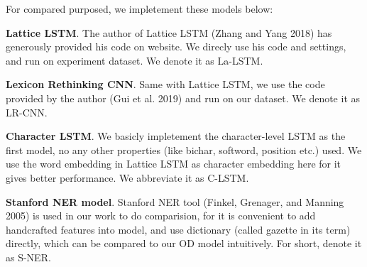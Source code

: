 \documentclass[letterpaper]{article} %
\begin{document}
\begin{table}[t]
\caption{Hyperparameters}\smallskip
\centering
{}
\label{table2}
\end{table}

For compared purposed, we impletement these models below:

\textbf{Lattice LSTM}. The author of Lattice LSTM (Zhang and Yang 2018) has generously provided his code on website. We direcly use his code and settings, and run on experiment dataset. We denote it as La-LSTM.

\textbf{Lexicon Rethinking CNN}. Same with Lattice LSTM, we use the code provided by the author (Gui et al. 2019) and run on our dataset. We denote it as LR-CNN.

\textbf{Character LSTM}. We basicly impletement the character-level LSTM as the first model, no any other properties (like bichar, softword, position etc.) used. We use the word embedding in Lattice LSTM as character embedding here for it gives better performance. We abbreviate it as C-LSTM.

\textbf{Stanford NER model}. Stanford NER tool (Finkel, Grenager, and Manning 2005) is used in our work to do comparision, for it is convenient to add handcrafted features into model, and use dictionary (called gazette in its term) directly, which can be compared to our OD model intuitively. For short, denote it as S-NER. 
\end{document}
